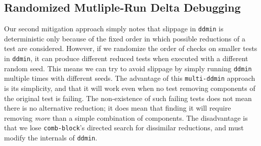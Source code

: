 \begin{algorithm}
\caption{}
\label{comb-block}
\begin{algorithmic}[1]
\EndIf
{}
\Else
{}
\EndIf
\EndIf
\EndFor
\EndFor
{}
\EndWhile
{}
\end{algorithmic}
\end{algorithm}

\subsection{Randomized Mutliple-Run Delta Debugging}

Our second mitigation approach simply notes that slippage in {\tt ddmin} is
deterministic only because of the fixed order in which possible
reductions of a test  are considered.  However, if we randomize
the order of checks on smaller tests in {\tt ddmin}, it can produce different
reduced tests when executed with a different random seed.  This means
we can try to avoid slippage by simply running {\tt ddmin} multiple
times with different seeds.  The advantage of this {\tt multi-ddmin} approach is its
simplicity, and that it will work even when no test removing
components of the original test is failing.  The non-existence of such
failing tests does not mean
there is no alternative reduction; it does mean that finding it will
require removing \emph{more} than a simple combination of components.
The disadvantage is that we lose {\tt comb-block}'s directed search
for dissimilar reductions, and must modify the internals of {\tt ddmin}.